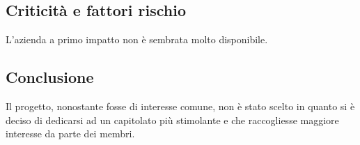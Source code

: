 \subsection{Criticità e fattori rischio}
L’azienda a primo impatto non è sembrata molto disponibile.

\subsection{Conclusione}
Il progetto, nonostante fosse di interesse comune, non è stato scelto in quanto si è deciso di dedicarsi ad un capitolato più stimolante e che raccogliesse maggiore interesse da parte dei membri.

